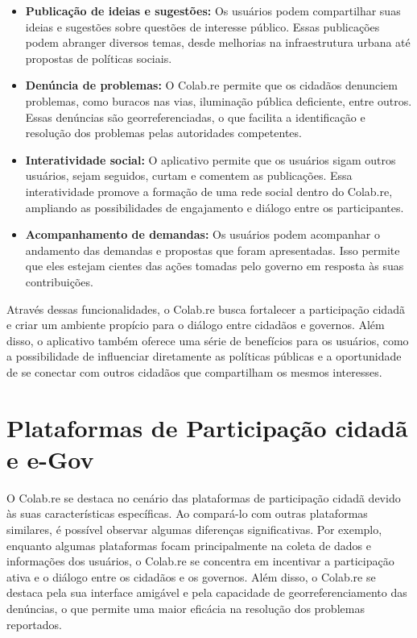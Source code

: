 \begin{itemize}
  \item \textbf{Publicação de ideias e sugestões:} Os usuários podem compartilhar suas ideias e sugestões sobre questões de interesse público. Essas publicações podem abranger diversos temas, desde melhorias na infraestrutura urbana até propostas de políticas sociais.

  \item \textbf{Denúncia de problemas:} O Colab.re permite que os cidadãos denunciem problemas, como buracos nas vias, iluminação pública deficiente, entre outros. Essas denúncias são georreferenciadas, o que facilita a identificação e resolução dos problemas pelas autoridades competentes.

  \item \textbf{Interatividade social:} O aplicativo permite que os usuários sigam outros usuários, sejam seguidos, curtam e comentem as publicações. Essa interatividade promove a formação de uma rede social dentro do Colab.re, ampliando as possibilidades de engajamento e diálogo entre os participantes.

  \item \textbf{Acompanhamento de demandas:} Os usuários podem acompanhar o andamento das demandas e propostas que foram apresentadas. Isso permite que eles estejam cientes das ações tomadas pelo governo em resposta às suas contribuições.
\end{itemize}

Através dessas funcionalidades, o Colab.re busca fortalecer a participação cidadã e criar um ambiente propício para o diálogo entre cidadãos e governos. Além disso, o aplicativo também oferece uma série de benefícios para os usuários, como a possibilidade de influenciar diretamente as políticas públicas e a oportunidade de se conectar com outros cidadãos que compartilham os mesmos interesses.

\section{Plataformas de Participação cidadã e e-Gov}
O Colab.re se destaca no cenário das plataformas de participação cidadã devido às suas características específicas. Ao compará-lo com outras plataformas similares, é possível observar algumas diferenças significativas. Por exemplo, enquanto algumas plataformas focam principalmente na coleta de dados e informações dos usuários, o Colab.re se concentra em incentivar a participação ativa e o diálogo entre os cidadãos e os governos. Além disso, o Colab.re se destaca pela sua interface amigável e pela capacidade de georreferenciamento das denúncias, o que permite uma maior eficácia na resolução dos problemas reportados.

